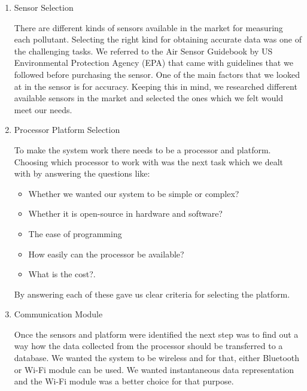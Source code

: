 \begin {enumerate}

\item{Sensor Selection}

There are different kinds of sensors available in the market for measuring each pollutant. Selecting the right kind for obtaining accurate data was one of the challenging tasks. We referred to the Air Sensor Guidebook by US Environmental Protection Agency (EPA)\cite{airsensorguidebook} that came with guidelines that we followed before purchasing the sensor. One of the main factors that we looked at in the sensor is for accuracy. Keeping this in mind, we researched different available sensors in the market and selected the ones which we felt would meet our needs. 


\item{Processor Platform Selection}

To make the system work there needs to be a processor and platform. Choosing which processor to work with was the next task which we dealt with by answering the questions like:
\begin{itemize}
   \item Whether we wanted our system to be simple or complex? 
  \item Whether it is open-source in hardware and software? 
  \item The ease of programming
  \item How easily can the processor be available? 
  \item What is the cost?.

\end{itemize}

By answering each of these gave us clear criteria for selecting the platform.


\item{Communication Module}

Once the sensors and platform were identified the next step was to find out a way how the data collected from the processor should be transferred to a database. We wanted the system to be wireless and for that, either Bluetooth or Wi-Fi module can be used. We wanted instantaneous data representation and the Wi-Fi module was a better choice for that purpose. 


\end{enumerate}

